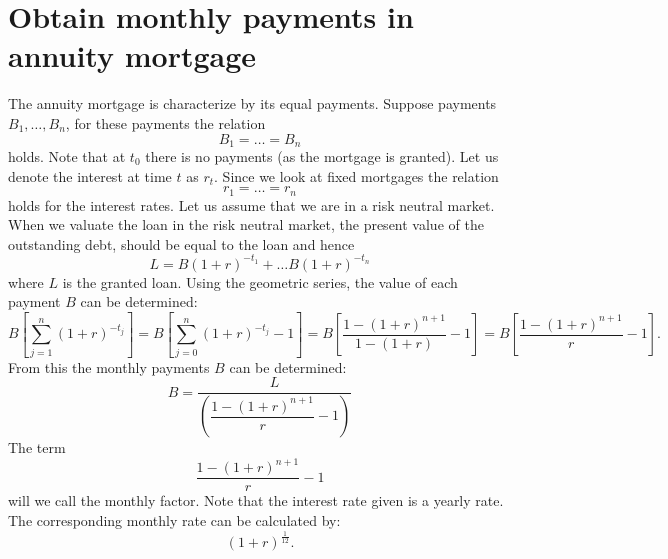 \section{Obtain monthly payments in annuity mortgage}
    The annuity mortgage is characterize by its equal payments. 
    Suppose payments $B_1, \ldots, B_n$, for these payments the relation
    \begin{equation}
        B_1 = \ldots = B_n 
    \end{equation}
    holds. Note that at $t_0$ there is no payments (as the mortgage is granted).
    Let us denote the interest at time $t$ as $r_t$. Since we look at fixed mortgages 
    the relation
    \begin{equation}
        r_1 = \ldots = r_n
    \end{equation}
    holds for the interest rates. 
    Let us assume that we are in a risk neutral market. When we valuate the loan in the risk 
    neutral market, the present value of the outstanding debt, should be equal to the loan
    and hence
    \begin{equation}
        L = B (1 + r)^{-t_1} + \ldots B (1 + r)^{-t_n}
    \end{equation}
    where $L$ is the granted loan. Using the geometric series, the value of each payment 
    $B$ can be determined: 
    \begin{equation}
        B\left[
            \displaystyle\sum_{j=1}^{n} (1 + r)^{-t_j}  
        \right] = 
        B\left[
            \displaystyle\sum_{j=0}^{n} (1 + r)^{-t_j} - 1  
        \right] = 
        B \left[
            \dfrac{1 - (1 + r)^{n+1}}{1 - (1 + r)} - 1
        \right] =
        B \left[
            \dfrac{1 - (1 + r)^{n+1}}{r}  - 1
        \right].
    \end{equation}
    From this the monthly payments $B$ can be determined: 
    \begin{equation}
        B = \dfrac{L}{
            \left(
                \dfrac{1 - (1 + r)^{n+1}}{r} - 1
            \right)
        }
    \end{equation}
    The term 
    \begin{equation}
        \dfrac{1 - (1 + r)^{n+1}}{r} - 1        
    \end{equation}
    will we call the monthly factor. Note that the interest rate given is a yearly rate. The 
    corresponding monthly rate can be calculated by: 
    \begin{equation}
        (1 + r)^{\frac{1}{12}}.
    \end{equation} 